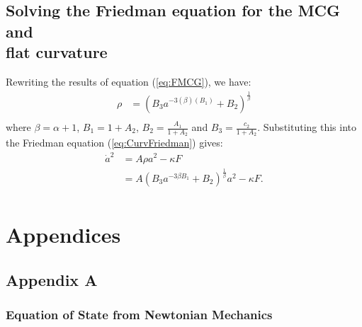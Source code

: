 \documentclass[a4paper, 11pt]{FSKH_623_Report}
\numberwithin{equation}{section}
\newcommand{\brac}[1]{\left(#1\right)}
\begin{document}
\section{Solving the Friedman equation for the MCG and\\ flat curvature}
Rewriting the results of equation (\ref{eq:FMCG}), we have:
\begin{equation}\label{eq:ReFMCG}
\begin{split}
\rho&=\brac{B_{3}a^{-3\brac{\beta}\brac{B_{1}}}+B_{2}}^{\frac{1}{\beta}}\\
\end{split}
\end{equation}
where $\beta=\alpha+1$, $B_{1}=1+A_{2}$, $B_{2}=\frac{A_{1}}{1+A_{2}}$ and $B_{3}=\frac{c_{2}}{1+A_{2}}$. Substituting this into the Friedman equation (\ref{eq:CurvFriedman}) gives:
\begin{equation}\label{eq:B6}
\begin{split}
\dot{a}^{2} &= A\rho a^{2}-\kappa F\\
&= A\brac{B_{3}a^{-3\beta B_{1}}+B_{2}}^{\frac{1}{\beta}} a^{2}-\kappa F.\\
\end{split}
\end{equation}


\newpage
\chapter{Appendices}
\section*{Appendix A}
\subsection*{Equation of State from Newtonian Mechanics}
\end{document}
